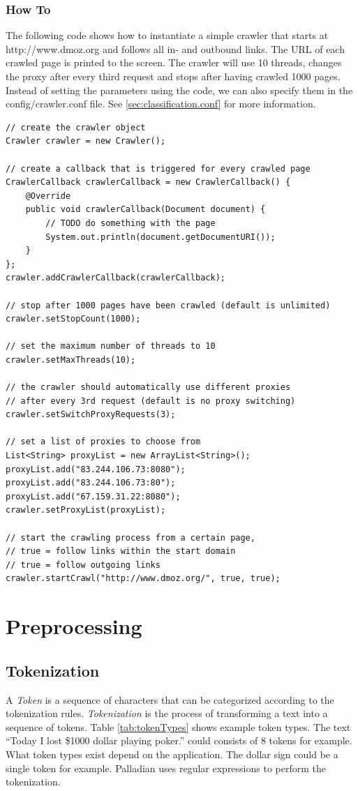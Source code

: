 \documentclass[a4paper,twoside]{book}      %
\begin{document}
\subsubsection{How To}
The following code shows how to instantiate a simple crawler that starts at http://www.dmoz.org and follows all in- and outbound links. The URL of each crawled page is printed to the screen. The crawler will use 10 threads, changes the proxy after every third request and stops after having crawled 1000 pages. Instead of setting the parameters using the code, we can also specify them in the config/crawler.conf file. See \ref{sec:classification.conf} for more information.

\begin{codelisting}
\begin{lstlisting}[caption=Using the web crawler.,frame=tb]
// create the crawler object
Crawler crawler = new Crawler();

// create a callback that is triggered for every crawled page
CrawlerCallback crawlerCallback = new CrawlerCallback() {
	@Override
	public void crawlerCallback(Document document) {
		// TODO do something with the page
		System.out.println(document.getDocumentURI());
	}
};
crawler.addCrawlerCallback(crawlerCallback);

// stop after 1000 pages have been crawled (default is unlimited)
crawler.setStopCount(1000);

// set the maximum number of threads to 10
crawler.setMaxThreads(10);

// the crawler should automatically use different proxies
// after every 3rd request (default is no proxy switching)
crawler.setSwitchProxyRequests(3);

// set a list of proxies to choose from
List<String> proxyList = new ArrayList<String>();
proxyList.add("83.244.106.73:8080");
proxyList.add("83.244.106.73:80");
proxyList.add("67.159.31.22:8080");
crawler.setProxyList(proxyList);

// start the crawling process from a certain page,
// true = follow links within the start domain
// true = follow outgoing links
crawler.startCrawl("http://www.dmoz.org/", true, true);
\end{lstlisting}
\end{codelisting}

\section{Preprocessing}
\subsection{Tokenization}
A \textit{Token} is a sequence of characters that can be categorized according to the tokenization rules. \textit{Tokenization} is the process of transforming a text into a sequence of tokens. Table \ref{tab:tokenTypes} shows example token types. The text ``Today I lost \$1000 dollar playing poker.'' could consists of 8 tokens for example. What token types exist depend on the application. The dollar sign could be a single token for example. Palladian uses regular expressions to perform the tokenization.
\end{document}
